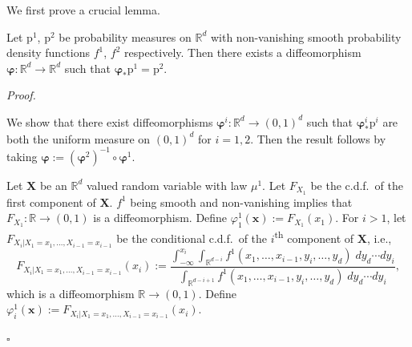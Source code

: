 \documentclass[runningheads,orivec]{llncs}
\newcommand{\R}{\mathbb R}
\newcommand{\inv}{^{-1}}
\newenvironment{proof}[1][Proof]{%
    \par\noindent\textit{#1. }%
    \ignorespaces
}{%
    \hfill$\square$ %
    \par
}
\begin{document}
We first prove a crucial lemma.
\begin{lemma}\label{lem:mapping-distributions}
    Let $\mathrm p^1$, $\mathrm p^2$ be probability measures on $\R^d$ with non-vanishing smooth probability density functions $f^1$, $f^2$ respectively. Then there exists a diffeomorphism $\bm\varphi\colon\R^d\to\R^d$ such that $\bm\varphi_*\mathrm p^1 = \mathrm p^2$.
\end{lemma}
\begin{proof}
    We show that there exist diffeomorphisms $\bm\varphi^i\colon \R^d\to (0,1)^d$ such that $\bm\varphi^i_*\mathrm p^i$ are both  the uniform measure on $(0,1)^d$ for $i=1,2$. Then the result follows by taking $\bm\varphi := (\bm\varphi^2)\inv\circ\bm \varphi^1$.
    
    Let $\bm X$ be an $\R^d$ valued random variable with law $\mu^1$. Let $F_{X_1}$ be the c.d.f.~of the first component of $\bm X$. $f^1$ being smooth and non-vanishing implies that $F_{X_1}\colon \R\to (0,1)$ is a diffeomorphism. Define $\varphi^1_1(\bm x) := F_{X_1}(x_1)$. For $i>1$, let $F_{X_i|X_1=x_1,\dots,X_{i-1}=x_{i-1}}$ be the conditional c.d.f.~of the $i$\textsuperscript{th} component of $\bm X$, i.e.,
    \[
        F_{X_i|X_1=x_1,\dots,X_{i-1}=x_{i-1}}(x_i) := \frac{\int_{-\infty}^{x_i}\int_{\R^{d-i}}f^1(x_1,\dots,x_{i-1}, y_i,\dots, y_d)\;dy_d\cdots dy_i}{\int_{\R^{d-i+1}}f^1(x_1,\dots,x_{i-1}, y_i,\dots, y_d)\;dy_d\cdots dy_i},
    \]
    which is a diffeomorphism $\R\to(0,1)$. Define $\varphi^1_i(\bm x) := F_{X_i|X_1=x_1,\dots,X_{i-1}=x_{i-1}}(x_i)$.


\end{proof}
\end{document}
